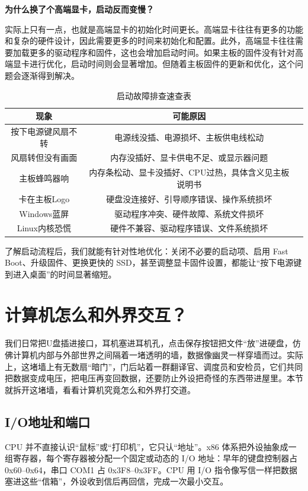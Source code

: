 \textbf{为什么换了个高端显卡，启动反而变慢？}

实际上只有一点，也就是高端显卡的初始化时间更长。高端显卡往往有更多的功能和复杂的硬件设计，因此需要更多的时间来初始化和配置。此外，高端显卡往往需要加载更多的驱动程序和固件，这也会增加启动时间。如果主板的固件没有针对高端显卡进行优化，启动时间则会显著增加。但随着主板固件的更新和优化，这个问题会逐渐得到解决。

\begin{table}[htbp]
  \centering
  \caption{启动故障排查速查表}
  \begin{tabular}{ccc}
    \toprule
    现象 & 可能原因 \\
    \midrule
    按下电源键风扇不转 & 电源线没插、电源损坏、主板供电线松动 \\
    风扇转但没有画面 & 内存没插好、显卡供电不足、或显示器问题 \\
    主板蜂鸣器响 & 内存条松动、显卡没插好、CPU过热，具体含义见主板说明书 \\
    卡在主板Logo & 硬盘没连接好、引导顺序错误、操作系统损坏 \\
    Windows蓝屏 & 驱动程序冲突、硬件故障、系统文件损坏 \\
    Linux内核恐慌 & 硬件不兼容、驱动程序错误、文件系统损坏 \\
    \bottomrule
  \end{tabular}
\end{table}

了解启动流程后，我们就能有针对性地优化：关闭不必要的启动项、启用 Fast Boot、升级固件、更换更快的 SSD，甚至调整显卡固件设置，都能让“按下电源键到进入桌面”的时间显著缩短。

\section{计算机怎么和外界交互？}

我们日常把U盘插进接口，耳机塞进耳机孔，点击保存按钮把文件“放”进硬盘，仿佛计算机内部与外部世界之间隔着一堵透明的墙，数据像幽灵一样穿墙而过。实际上，这堵墙上有无数扇“暗门”，门后站着一群翻译官、调度员和安检员，它们共同把数据变成电压，把电压再变回数据，还要防止外设把奇怪的东西带进屋里。本节就拆开这堵墙，看看计算机究竟怎么和外界打交道。

\subsection{I/O地址和端口}

CPU 并不直接认识“鼠标”或“打印机”，它只认“地址”。x86 体系把外设抽象成一组寄存器，每个寄存器被分配一个固定或动态的 I/O 地址：早年的键盘控制器占 0x60–0x64，串口 COM1 占 0x3F8–0x3FF。CPU 用 I/O 指令像写信一样把数据塞进这些“信箱”，外设收到信后再回信，完成一次最小交互。

